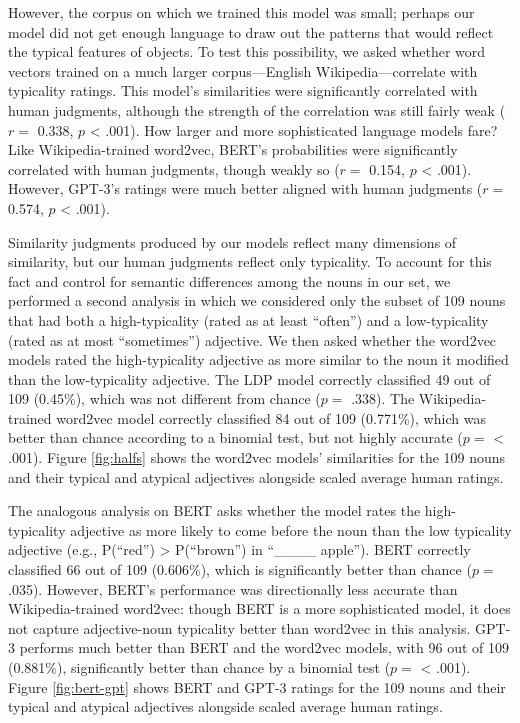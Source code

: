 \documentclass{ucetd}
\begin{document}
However, the corpus on which we trained this model was small; perhaps
our model did not get enough language to draw out the patterns that
would reflect the typical features of objects. To test this possibility,
we asked whether word vectors trained on a much larger corpus---English
Wikipedia---correlate with typicality ratings. This model's similarities
were significantly correlated with human judgments, although the
strength of the correlation was still fairly weak (\(r =\) 0.338, \(p\)
\textless{} .001). How larger and more sophisticated language models
fare? Like Wikipedia-trained word2vec, BERT's probabilities were
significantly correlated with human judgments, though weakly so (\(r =\)
0.154, \(p\) \textless{} .001). However, GPT-3's ratings were much
better aligned with human judgments (\(r =\) 0.574, \(p\) \textless{}
.001).

Similarity judgments produced by our models reflect many dimensions of
similarity, but our human judgments reflect only typicality. To account
for this fact and control for semantic differences among the nouns in
our set, we performed a second analysis in which we considered only the
subset of 109 nouns that had both a high-typicality (rated as at least
``often'') and a low-typicality (rated as at most ``sometimes'')
adjective. We then asked whether the word2vec models rated the
high-typicality adjective as more similar to the noun it modified than
the low-typicality adjective. The LDP model correctly classified 49 out
of 109 (0.45\%), which was not different from chance (\(p =\) .338). The
Wikipedia-trained word2vec model correctly classified 84 out of 109
(0.771\%), which was better than chance according to a binomial test,
but not highly accurate (\(p =\) \textless{} .001). Figure
\ref{fig:halfs} shows the word2vec models' similarities for the 109
nouns and their typical and atypical adjectives alongside scaled average
human ratings.

The analogous analysis on BERT asks whether the model rates the
high-typicality adjective as more likely to come before the noun than
the low typicality adjective (e.g., P(``red'') \textgreater{}
P(``brown'') in ``\_\_\_\_ apple''). BERT correctly classified 66 out of
109 (0.606\%), which is significantly better than chance (\(p =\) .035).
However, BERT's performance was directionally less accurate than
Wikipedia-trained word2vec: though BERT is a more sophisticated model,
it does not capture adjective-noun typicality better than word2vec in
this analysis. GPT-3 performs much better than BERT and the word2vec
models, with 96 out of 109 (0.881\%), significantly better than chance
by a binomial test (\(p =\) \textless{} .001). Figure \ref{fig:bert-gpt}
shows BERT and GPT-3 ratings for the 109 nouns and their typical and
atypical adjectives alongside scaled average human ratings.
\end{document}
